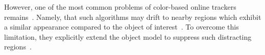 \documentclass[a4paper,10pt]{article}
\begin{document}
However, one of the most common problems of color-based online trackers remains~\cite{possegger15}.
Namely, that such algorithms may drift to nearby regions which exhibit a similar appearance compared to the object of interest~\cite{possegger15}.
To overcome this limitation, they explicitly extend the object model to suppress such distracting regions~\cite{possegger15}.
\end{document}
